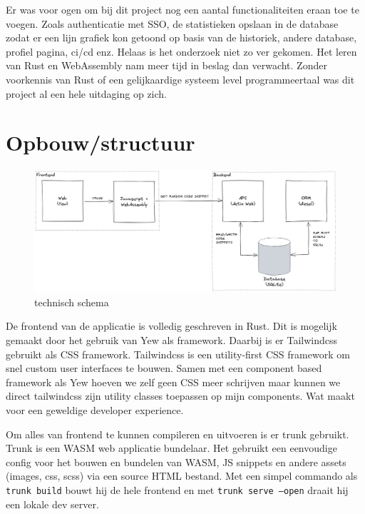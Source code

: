 Er was voor ogen om bij dit project nog een aantal functionaliteiten eraan toe te voegen. Zoals
authenticatie met SSO, de statistieken opslaan in de database zodat er een lijn grafiek kon getoond
op basis van de historiek, andere database, profiel pagina, ci/cd enz. Helaas is het onderzoek niet
zo ver gekomen. Het leren van Rust en WebAssembly nam meer tijd in beslag dan verwacht. Zonder
voorkennis van Rust of een gelijkaardige systeem level programmeertaal was dit project al een hele
uitdaging op zich.

\clearpage

\section{Opbouw/structuur}

\begin{figure}[h]
  \includegraphics[width=\textwidth]{./figures/structuur.png}
  \caption{technisch schema}
\end{figure}

De frontend van de applicatie is volledig geschreven in Rust. Dit is mogelijk gemaakt door het
gebruik van Yew als framework. Daarbij is er Tailwindcss gebruikt als CSS framework. Tailwindcss is
een utility-first CSS framework om snel custom user interfaces te bouwen. Samen met een component
based framework als Yew hoeven we zelf geen CSS meer schrijven maar kunnen we direct tailwindcss
zijn utility classes toepassen op mijn components. Wat maakt voor een geweldige developer
experience. 

Om alles van frontend te kunnen compileren en uitvoeren is er trunk gebruikt. Trunk is een WASM web
applicatie bundelaar. Het gebruikt een eenvoudige config voor het bouwen en bundelen van WASM, JS
snippets en andere assets (images, css, scss) via een source HTML bestand. Met een simpel commando
als \texttt{trunk build} bouwt hij de hele frontend en met \texttt{trunk serve
--open} draait hij een lokale dev server.  

